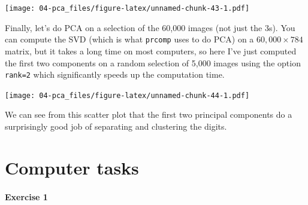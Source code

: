 \documentclass[
]{book}
\newenvironment{Shaded}{\begin{snugshade}}{\end{snugshade}}
\newcommand{\AttributeTok}[1]{\textcolor[rgb]{0.13,0.29,0.53}{#1}}
\newcommand{\CommentTok}[1]{\textcolor[rgb]{0.56,0.35,0.01}{\textit{#1}}}
\newcommand{\DecValTok}[1]{\textcolor[rgb]{0.00,0.00,0.81}{#1}}
\newcommand{\FunctionTok}[1]{\textcolor[rgb]{0.13,0.29,0.53}{\textbf{#1}}}
\newcommand{\NormalTok}[1]{#1}
\newcommand{\OtherTok}[1]{\textcolor[rgb]{0.56,0.35,0.01}{#1}}
\newcommand{\SpecialCharTok}[1]{\textcolor[rgb]{0.81,0.36,0.00}{\textbf{#1}}}
\theoremstyle{definition}
\theoremstyle{definition}
\theoremstyle{definition}
\theoremstyle{definition}
\theoremstyle{remark}
\begin{document}
\texttt{[image: 04-pca\_files/figure-latex/unnamed-chunk-43-1.pdf]}

Finally, let's do PCA on a selection of the 60,000 images (not just the 3s). You can compute the SVD (which is what \texttt{prcomp} uses to do PCA) on a \(60,000 \times 784\) matrix, but it takes a long time on most computers, so here I've just computed the first two components on a random selection of 5,000 images using the option \texttt{rank=2} which significantly speeds up the computation time.

\begin{Shaded}
\end{Shaded}

\texttt{[image: 04-pca\_files/figure-latex/unnamed-chunk-44-1.pdf]}

We can see from this scatter plot that the first two principal components do a surprisingly good job of separating and clustering the digits.

\hypertarget{pca-comptask}{%
\section{Computer tasks}\label{pca-comptask}}

\hypertarget{exercise-1}{%
\paragraph*{Exercise 1}\label{exercise-1}}
\end{document}
